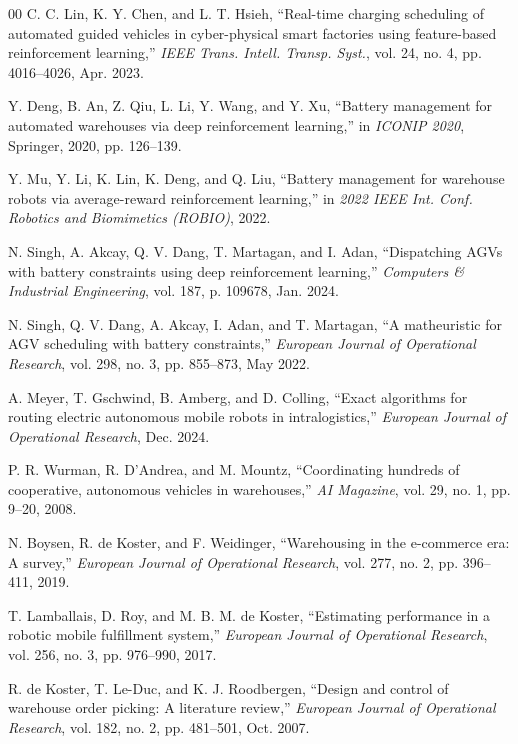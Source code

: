 \documentclass[conference]{IEEEtran}
\begin{document}
\begin{thebibliography}{00}
C. C. Lin, K. Y. Chen, and L. T. Hsieh, ``Real-time charging scheduling of automated guided vehicles in cyber-physical smart factories using feature-based reinforcement learning,'' \emph{IEEE Trans. Intell. Transp. Syst.}, vol. 24, no. 4, pp. 4016--4026, Apr. 2023.

Y. Deng, B. An, Z. Qiu, L. Li, Y. Wang, and Y. Xu, ``Battery management for automated warehouses via deep reinforcement learning,'' in \emph{ICONIP 2020}, Springer, 2020, pp. 126--139.

Y. Mu, Y. Li, K. Lin, K. Deng, and Q. Liu, ``Battery management for warehouse robots via average-reward reinforcement learning,'' in \emph{2022 IEEE Int. Conf. Robotics and Biomimetics (ROBIO)}, 2022.

N. Singh, A. Akcay, Q. V. Dang, T. Martagan, and I. Adan, ``Dispatching AGVs with battery constraints using deep reinforcement learning,'' \emph{Computers \& Industrial Engineering}, vol. 187, p. 109678, Jan. 2024.

N. Singh, Q. V. Dang, A. Akcay, I. Adan, and T. Martagan, ``A matheuristic for AGV scheduling with battery constraints,'' \emph{European Journal of Operational Research}, vol. 298, no. 3, pp. 855--873, May 2022.

A. Meyer, T. Gschwind, B. Amberg, and D. Colling, ``Exact algorithms for routing electric autonomous mobile robots in intralogistics,'' \emph{European Journal of Operational Research}, Dec. 2024.

P. R. Wurman, R. D'Andrea, and M. Mountz, ``Coordinating hundreds of cooperative, autonomous vehicles in warehouses,'' \emph{AI Magazine}, vol. 29, no. 1, pp. 9--20, 2008.

N. Boysen, R. de Koster, and F. Weidinger, ``Warehousing in the e-commerce era: A survey,'' \emph{European Journal of Operational Research}, vol. 277, no. 2, pp. 396--411, 2019.

T. Lamballais, D. Roy, and M. B. M. de Koster, ``Estimating performance in a robotic mobile fulfillment system,'' \emph{European Journal of Operational Research}, vol. 256, no. 3, pp. 976--990, 2017.

R. de Koster, T. Le-Duc, and K. J. Roodbergen, ``Design and control of warehouse order picking: A literature review,'' \emph{European Journal of Operational Research}, vol. 182, no. 2, pp. 481--501, Oct. 2007.


\end{thebibliography}
\end{document}

